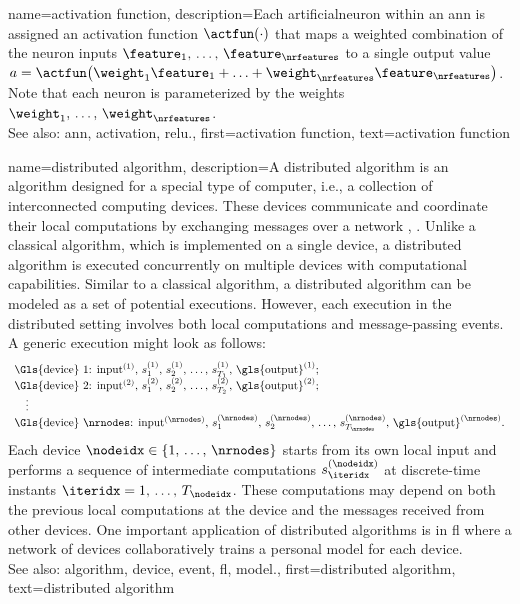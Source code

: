 {name={activation function},
	description={Each \gls{artificialneuron} within an \gls{ann} is 
		assigned an \gls{activation} \gls{function} $\actfun(\cdot)$ that maps a weighted 
		combination of the \gls{neuron} inputs $\feature_{1}, \,\ldots, \,\feature_{\nrfeatures}$ 
		to a single \gls{output} value $a = \actfun\big(\weight_{1} \feature_{1}+\ldots+\weight_{\nrfeatures} \feature_{\nrfeatures} \big)$. 
		Note that each \gls{neuron} is parameterized by the \glspl{weight} $\weight_{1}, \,\ldots, \,\weight_{\nrfeatures}$.
					\\ 
		See also: \gls{ann}, \gls{activation}, \gls{relu}.},
	first={activation function},
	text={activation function} 
}

{name={distributed algorithm},
	description={A distributed \gls{algorithm} is an \gls{algorithm} designed for 
		a special type of computer, i.e., a collection of interconnected computing \glspl{device}.
		These \glspl{device} communicate and coordinate their local computations by exchanging
		messages over a network \cite{ParallelDistrBook}, \cite{IntroDistAlg}. Unlike a classical \gls{algorithm},
		which is implemented on a single \gls{device}, a distributed \gls{algorithm} is
		executed concurrently on multiple \glspl{device} with computational capabilities.
		Similar to a classical \gls{algorithm}, a distributed \gls{algorithm} can be modeled as a
		set of potential executions. However, each execution in the distributed setting involves
		both local computations and message-passing \glspl{event}. A generic execution might look as
		follows:
		\[
		\begin{array}{l}
			\text{\Gls{device} } 1\text{: } {\rm input}^{(1)}, \,s_1^{(1)}, \,s_2^{(1)}, \,\ldots, \,s_{T_1}^{(1)}, \,{\rm \gls{output}}^{(1)}; \\
			\text{\Gls{device} } 2\text{: } {\rm input}^{(2)}, \,s_1^{(2)}, \,s_2^{(2)}, \,\ldots, \,s_{T_2}^{(2)}, \,{\rm \gls{output}}^{(2)}; \\
			\quad \vdots \\
			\text{\Gls{device} } \nrnodes\text{: } {\rm input}^{(\nrnodes)}, \,s_1^{(\nrnodes)}, \,s_2^{(\nrnodes)}, \,\ldots, \,s_{T_{\nrnodes}}^{(\nrnodes)}, \,{\rm \gls{output}}^{(\nrnodes)}.
		\end{array}
		\]
		Each \gls{device} $\nodeidx \in \{1,\,\ldots,\,\nrnodes\}$ starts from its own local input and performs a \gls{sequence} of 
		intermediate computations $s_{\iteridx}^{(\nodeidx)}$ at discrete-time instants $\iteridx = 1, \,\dots, \,T_{\nodeidx}$. 
		These computations may depend on both the previous local computations at the \gls{device} 
		and the messages received from other \glspl{device}. One important application of distributed 
		\glspl{algorithm} is in \gls{fl} where a network of \glspl{device} collaboratively trains a personal \gls{model} 
		for each \gls{device}. 
					\\ 
		See also: \gls{algorithm}, \gls{device}, \gls{event}, \gls{fl}, \gls{model}.},
	first={distributed algorithm}, 
	text={distributed algorithm}
}


